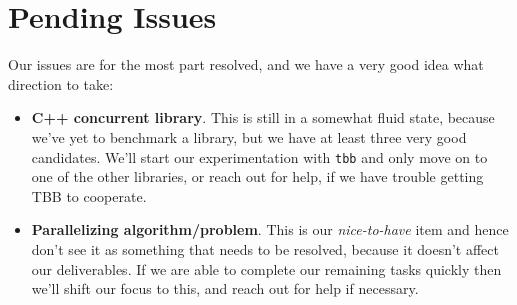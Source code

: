 \documentclass[11pt]{article}
\begin{document}
\section*{Pending Issues}
Our issues are for the most part resolved, and we have a very good idea what
direction to take:

\begin{itemize}
\item
{\bf C++ concurrent library}. This is still in a somewhat fluid state, because
we've yet to benchmark a library, but we have at least three very good candidates.
We'll start our experimentation with {\tt tbb} and only move on to one of the
other libraries, or reach out for help, if we have trouble getting TBB to
cooperate.
\item
{\bf Parallelizing algorithm/problem}. This is our {\it nice-to-have} item and
hence don't see it as something that needs to be resolved, because it doesn't
affect our deliverables. If we are able to complete our remaining tasks quickly
then we'll shift our focus to this, and reach out for help if necessary.
\end{itemize}

\printbibliography
\end{document}
